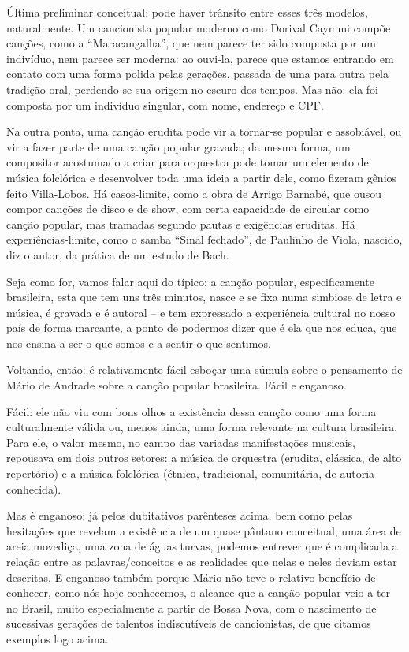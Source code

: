 Última preliminar conceitual: pode haver trânsito entre esses três
modelos, naturalmente. Um cancionista popular moderno como Dorival
Caymmi compõe canções, como a ``Maracangalha'', que nem parece ter sido
composta por um indivíduo, nem parece ser moderna: ao ouvi-la, parece
que estamos entrando em contato com uma forma polida pelas gerações,
passada de uma para outra pela tradição oral, perdendo-se sua origem no
escuro dos tempos. Mas não: ela foi composta por um indivíduo singular,
com nome, endereço e CPF.

Na outra ponta, uma canção erudita pode vir a tornar-se popular e
assobiável, ou vir a fazer parte de uma canção popular gravada; da mesma
forma, um compositor acostumado a criar para orquestra pode tomar um
elemento de música folclórica e desenvolver toda uma ideia a partir
dele, como fizeram gênios feito Villa-Lobos. Há casos-limite, como a
obra de Arrigo Barnabé, que ousou compor canções de disco e de show, com
certa capacidade de circular como canção popular, mas tramadas segundo
pautas e exigências eruditas. Há experiências-limite, como o samba
``Sinal fechado'', de Paulinho de Viola, nascido, diz o autor, da
prática de um estudo de Bach.

Seja como for, vamos falar aqui do típico: a canção popular,
especificamente brasileira, esta que tem uns três minutos, nasce e se
fixa numa simbiose de letra e música, é gravada e é autoral -- e tem
expressado a experiência cultural no nosso país de forma marcante, a
ponto de podermos dizer que é ela que nos educa, que nos ensina a ser o
que somos e a sentir o que sentimos.

Voltando, então: é relativamente fácil esboçar uma súmula sobre o
pensamento de Mário de Andrade sobre a canção popular brasileira. Fácil
e enganoso.

Fácil: ele não viu com bons olhos a existência dessa canção como uma
forma culturalmente válida ou, menos ainda, uma forma relevante na
cultura brasileira. Para ele, o valor mesmo, no campo das variadas
manifestações musicais, repousava em dois outros setores: a música de
orquestra (erudita, clássica, de alto repertório) e a música folclórica
(étnica, tradicional, comunitária, de autoria conhecida).

Mas é enganoso: já pelos dubitativos parênteses acima, bem como pelas
hesitações que revelam a existência de um quase pântano conceitual, uma
área de areia movediça, uma zona de águas turvas, podemos entrever que é
complicada a relação entre as palavras/conceitos e as realidades que
nelas e neles deviam estar descritas. E enganoso também porque Mário não
teve o relativo benefício de conhecer, como nós hoje conhecemos, o
alcance que a canção popular veio a ter no Brasil, muito especialmente a
partir de Bossa Nova, com o nascimento de sucessivas gerações de
talentos indiscutíveis de cancionistas, de que citamos exemplos logo
acima.

